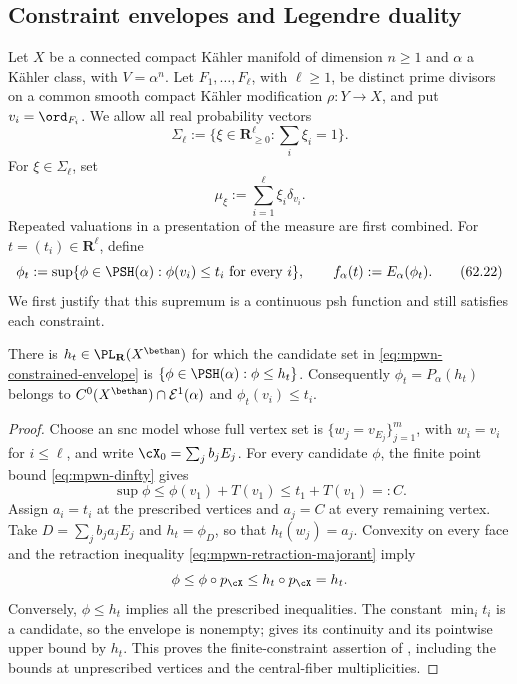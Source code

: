 \subsection{Constraint envelopes and Legendre duality}
\label{subsec:mpwn-k-legendre}

Let $X$ be a connected compact K\"ahler manifold of dimension $n\geq1$ and $\alpha$ a K\"ahler class, with $V=\alpha^n$. Let $F_1,\ldots,F_\ell$, with $\ell\geq1$, be distinct prime divisors on a common smooth compact K\"ahler modification $\rho:Y\to X$, and put $v_i=\ord_{F_i}$. We allow all real probability vectors
\[
 \Sigma_\ell:=\{\xi\in\mathbf R_{\geq0}^{\ell}:\sum_i\xi_i=1\}.
\]
For $\xi\in\Sigma_\ell$, set
\[
                         \mu_\xi:=\sum_{i=1}^\ell\xi_i\delta_{v_i}.
\tag{62.21}\label{eq:mpwn-muxi}
\]
Repeated valuations in a presentation of the measure are first combined.
For $t=(t_i)\in\mathbf R^\ell$, define
\[
 \phi_t:=\sup\{\phi\in\PSH(\alpha):
                         \phi(v_i)\leq t_i\text{ for every }i\},
 \qquad f_\alpha(t):=E_\alpha(\phi_t).
\tag{62.22}\label{eq:mpwn-constrained-envelope}
\]
We first justify that this supremum is a continuous psh function
and still satisfies each constraint.

\begin{lemma}\label{lem:mpwn-finite-constraint-obstacle}
There is $h_t\in\PL_{\mathbf R}(X^{\bethan})$ for which the candidate
set in \eqref{eq:mpwn-constrained-envelope} is
$\{\phi\in\PSH(\alpha):\phi\leq h_t\}$.
Consequently $\phi_t=P_\alpha(h_t)$ belongs to
$C^0(X^{\bethan})\cap\mathcal E^1(\alpha)$ and $\phi_t(v_i)\leq t_i$.
\end{lemma}

\begin{proof}
Choose an snc model whose full vertex set is
$\{w_j=v_{E_j}\}_{j=1}^m$, with $w_i=v_i$ for $i\leq\ell$,
and write $\cX_0=\sum_jb_jE_j$.
For every candidate $\phi$, the finite point bound
\eqref{eq:mpwn-dinfty} gives
\[
             \sup\phi\leq\phi(v_1)+T(v_1)
                         \leq t_1+T(v_1)=:C.
\]
Assign $a_i=t_i$ at the prescribed vertices and $a_j=C$ at every
remaining vertex.  Take
$D=\sum_jb_ja_jE_j$ and $h_t=\phi_D$, so that $h_t(w_j)=a_j$.
Convexity on every face and the retraction inequality
\eqref{eq:mpwn-retraction-majorant} imply
\[
       \phi\leq\phi\circ p_{\cX}
                    \leq h_t\circ p_{\cX}=h_t.
\]
Conversely, $\phi\leq h_t$ implies all the prescribed inequalities.
The constant $\min_i t_i$ is a candidate, so the envelope is nonempty;
 gives its continuity and its
pointwise upper bound by $h_t$.
This proves the finite-constraint assertion of
\cite[Lemma~7.1.5]{MPWN25}, including the bounds at unprescribed
vertices and the central-fiber multiplicities.
\end{proof}

